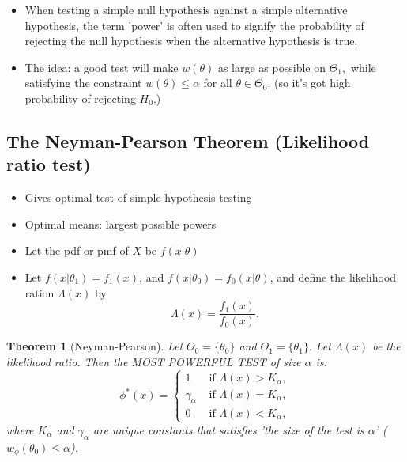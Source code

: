 \documentclass[12pt]{report} \addtolength{\textheight}{2in}
\newtheorem{thm}{Theorem}
\newcommand{\Tif}{\text{  if   }}
\begin{document}
\begin{description}
\begin{itemize}
\item When testing a simple null hypothesis against a simple alternative hypothesis, the term 'power' is often used to signify the probability of rejecting the null hypothesis when the alternative hypothesis is true.
\item The idea: a good test will make $w(\theta)$ as large as possible on $\Theta_1,$ while satisfying the constraint $w(\theta) \leq \alpha$ for all $\theta \in \Theta_{0}$. (so it's got high probability of rejecting $H_0.$)
\end{itemize}
\subsection*{The Neyman-Pearson Theorem (Likelihood ratio test)}
\begin{itemize}
\item Gives optimal test of simple hypothesis testing
\item Optimal means: largest possible powers
\item Let the pdf or pmf of $X$ be $f(x|\theta)$
\item Let $f(x|\theta_{1})=f_{1}(x)$, and $f(x|\theta_{0})=f_{0}(x|\theta)$, and define the likelihood ration $\Lambda(x)$ by
\begin{displaymath}
\Lambda(x)=\frac{f_{1}(x)}{f_{0}(x)}.
\end{displaymath}
\end{itemize}

\begin{thm}[Neyman-Pearson]
Let $\Theta_{0}=\{\theta_0\}$ and $\Theta_1=\{\theta_1\}.$ Let $\Lambda(x)$ be the likelihood ratio. Then the MOST POWERFUL TEST of size $\alpha$ is:
\begin{displaymath}
\phi^{*}(x) =
\begin{cases}
1 & \Tif \Lambda(x) > K_\alpha,\\
\gamma_{\alpha} & \Tif \Lambda(x) = K_{\alpha} ,\\
0 & \Tif \Lambda(x)< K_{\alpha},
\end{cases}
\end{displaymath} 
where $K_{\alpha}$ and $\gamma_{\alpha}$ are unique constants that satisfies 'the size of the test is $\alpha$' ($w_{\phi}(\theta_{0}) \leq \alpha$).
\end{thm}
\end{description} 
\end{document}
